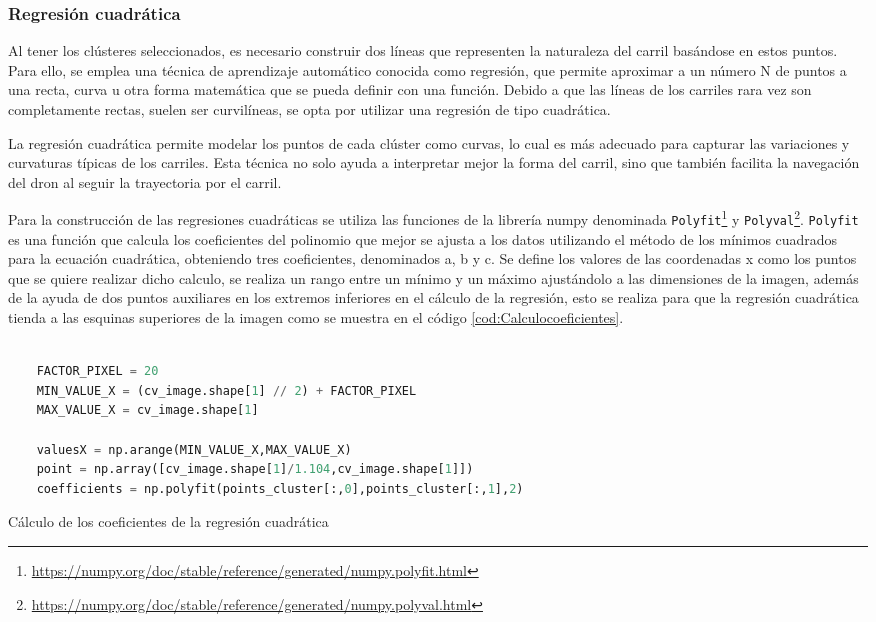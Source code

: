 \subsubsection{Regresión cuadrática}
\label{sec:Regresión cuadrática}
Al tener los clústeres seleccionados, es necesario construir dos líneas que representen la naturaleza del carril basándose en estos puntos. Para ello, se emplea una técnica de aprendizaje 
automático conocida como regresión, que permite aproximar a un número N de puntos a una recta, curva u otra forma matemática que se pueda definir con una función. 
Debido a que las líneas de los carriles rara vez son 
completamente rectas, suelen ser curvilíneas, se opta por utilizar una regresión de tipo cuadrática. 

La regresión cuadrática permite modelar los puntos de cada clúster como curvas, lo cual es más adecuado para capturar las variaciones y curvaturas típicas de los carriles. Esta técnica no solo
ayuda a interpretar mejor la forma del carril, sino que también facilita la navegación del dron al seguir la trayectoria por el carril. \newline

Para la construcción de las regresiones cuadráticas se utiliza las funciones de la librería numpy denominada \texttt{Polyfit}\footnote{\url{https://numpy.org/doc/stable/reference/generated/numpy.polyfit.html}}
y \texttt{Polyval}\footnote{\url{ https://numpy.org/doc/stable/reference/generated/numpy.polyval.html}}. 
\texttt{Polyfit} es una función que calcula los coeficientes del polinomio que mejor se ajusta a los datos utilizando el método de los mínimos 
cuadrados para la ecuación cuadrática, obteniendo tres coeficientes, denominados a, b y c. Se define los valores de las coordenadas x como los puntos que se quiere
realizar dicho calculo, se realiza un rango entre un mínimo y un máximo ajustándolo a las dimensiones de la imagen, además de la ayuda de 
dos puntos auxiliares en los extremos inferiores en el cálculo de la regresión, esto se realiza para que la regresión cuadrática tienda a las esquinas superiores de la imagen 
como se muestra en el código \ref{cod:Calculocoeficientes}.
 \newline

\begin{code}[H]
  \begin{lstlisting}[language=Python]
  
    FACTOR_PIXEL = 20
    MIN_VALUE_X = (cv_image.shape[1] // 2) + FACTOR_PIXEL
    MAX_VALUE_X = cv_image.shape[1]
  
    valuesX = np.arange(MIN_VALUE_X,MAX_VALUE_X) 
    point = np.array([cv_image.shape[1]/1.104,cv_image.shape[1]])
    coefficients = np.polyfit(points_cluster[:,0],points_cluster[:,1],2)
  \end{lstlisting}
  \caption[Calculo de los coeficientes]{Cálculo de los coeficientes de la regresión cuadrática}
  \label{cod:Calculocoeficientes}
  \end{code}  

